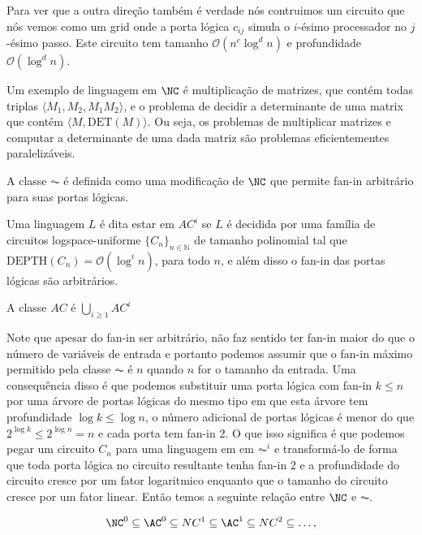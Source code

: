 Para ver que a outra direção também é verdade nós contruimos um circuito que nós vemos como um grid onde a porta lógica $c_{ij}$ simula o $i$-ésimo processador no $j$-ésimo passo. Este circuito tem tamanho $\mathcal{O}(n^{c}\log^{d}n)$ e profundidade $\mathcal{O}(\log^{d}n)$.

Um exemplo de linguagem em $\NC$ é multiplicação de matrizes, que contém todas triplas $\langle M_{1}, M_{2}, M_{1}M_{2} \rangle$, e o problema de decidir a determinante de uma matrix que contém $\langle M, \text{DET}(M) \rangle$. Ou seja, os problemas de multiplicar matrizes e computar a determinante de uma dada matriz são problemas eficientementes paralelizáveis.


A classe $\AC$  é definida como uma modificação de $\NC$ que permite fan-in arbitrário para suas portas lógicas.

\begin{defi}

Uma linguagem $L$ é dita estar em $AC^{i}$ se $L$ é decidida por uma família de circuitos logspace-uniforme $\{C_{n}\}_{n \in \mathbb{N}}$ de tamanho polinomial tal que $\text{DEPTH}(C_{n}) = \mathcal{O}(\log^{i} n)$, para todo $n$, e além disso o fan-in das portas lógicas são arbitrários.

A classe $AC$ é $\bigcup_{i \geq 1}AC^{i}$

\end{defi}

Note que apesar do fan-in ser arbitrário, não faz sentido ter fan-in maior do que o número de variáveis de entrada e portanto podemos assumir que o fan-in máximo permitido pela classe $\AC$ é $n$ quando $n$ for o tamanho da entrada. Uma consequência disso é que podemos substituir uma porta lógica com fan-in $k \leq n$ por uma árvore de portas lógicas do mesmo tipo em que esta árvore tem profundidade $\log k \leq \log n$, o número adicional de portas lógicas é menor do que $2^{\log k} \leq 2^{\log n} = n$ e cada porta tem fan-in 2. O que isso significa é que podemos pegar um circuito $C_{n}$ para uma linguagem em em $\AC^{i}$ e transformá-lo de forma que toda porta lógica no circuito resultante tenha fan-in 2 e a profundidade do circuito cresce por um fator logaritmico enquanto que o tamanho do circuito cresce por um fator linear. Então temos a seguinte relação entre $\NC$ e $\AC$.

\begin{equation*}
    \NC^{0} \subseteq \AC^{0} \subseteq NC^{1} \subseteq \AC^{1} \subseteq NC^{2} \subseteq \dots,
\end{equation*}

